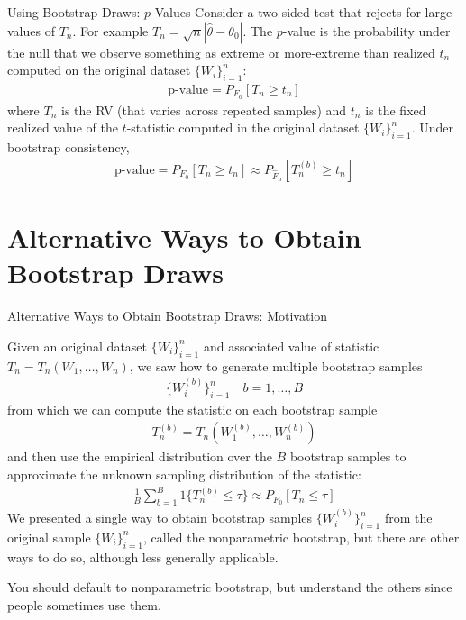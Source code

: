 \documentclass[aspectratio=169, handout]{beamer}
\begin{document}
\begin{frame}[shrink]{Using Bootstrap Draws: $p$-Values}
Consider a two-sided test that rejects for large values of $T_n$.
For example $T_n=\sqrt{n}|\hat{\theta}-\theta_0|$.
The $p$-value is the probability under the null that we observe
something as extreme or more-extreme than realized $t_n$ computed on the
original dataset $\{W_i\}_{i=1}^n$:
\begin{align*}
  \text{p-value}
  =
  P_{F_0}[T_n \geq t_n]
\end{align*}
where $T_n$ is the RV (that varies across repeated samples) and $t_n$ is
the fixed realized value of the $t$-statistic computed in the original
dataset $\{W_i\}_{i=1}^n$.
Under bootstrap consistency,
\begin{align*}
  \text{p-value}
  =
  P_{F_0}[T_n \geq t_n]
  \approx
  P_{\hat{F}_n}[T_n^{(b)}\geq t_n]
\end{align*}
\end{frame}




\section{Alternative Ways to Obtain Bootstrap Draws}


{\footnotesize
\begin{frame}{Alternative Ways to Obtain Bootstrap Draws: Motivation}

Given an original dataset $\{W_i\}_{i=1}^n$ and associated value of
statistic $T_n=T_n(W_1,\ldots,W_n)$, we saw how to generate
multiple \alert{bootstrap samples}
\begin{align*}
  \{W_i^{(b)}\}_{i=1}^n
  \quad b=1,\ldots,B
\end{align*}
from which we can compute the statistic on each bootstrap sample
\begin{align*}
  T_n^{(b)}=T_n(W_1^{(b)},\ldots,W_n^{(b)})
\end{align*}
and then use the empirical distribution over the $B$ bootstrap samples
to approximate the unknown sampling distribution of the statistic:
\begin{align*}
  \frac{1}{B}
  \sum_{b=1}^B
  1\{T_n^{(b)}\leq \tau\}
  \approx
  P_{F_0}[T_n \leq \tau]
\end{align*}
We presented a single way to obtain bootstrap samples
$\{W_i^{(b)}\}_{i=1}^n$ from the original sample $\{W_i\}_{i=1}^n$,
called the \alert{nonparametric bootstrap}, but there are other ways to
do so, although less generally applicable.

You should default to nonparametric bootstrap, but understand the others
since people sometimes use them.
\end{frame}
}
\end{document}
